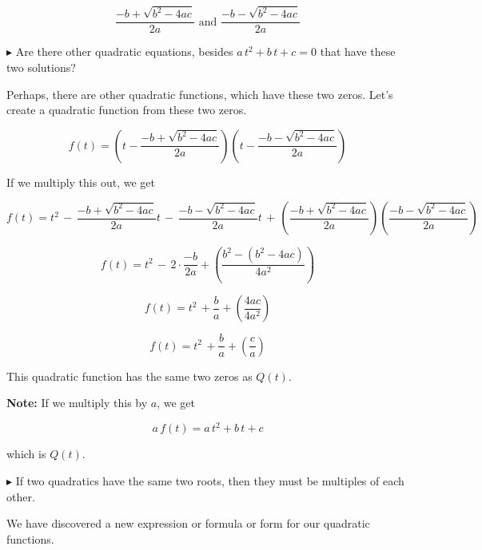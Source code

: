 \documentclass{ximera}
\begin{document}
\[   \frac{-b + \sqrt{b^2 - 4 a c}}{2a}     \text{ and }    \frac{-b - \sqrt{b^2 - 4 a c}}{2a}   \]





$\blacktriangleright$  Are there other quadratic equations, besides $a \, t^2 + b \, t + c = 0$ that have these two solutions?















Perhaps, there are other quadratic functions, which have these two zeros. Let's create a quadratic function from these two zeros.



\[ f(t) =  \left(t - \frac{-b + \sqrt{b^2 - 4 a c}}{2a}\right)   \left(t -  \frac{-b - \sqrt{b^2 - 4 a c}}{2a}\right)   \]


If we multiply this out, we get



\[ f(t) =   t^2 \, - \, \frac{-b + \sqrt{b^2 - 4 a c}}{2a} t \, - \, \frac{-b - \sqrt{b^2 - 4 a c}}{2a}  t \, + \, \left(\frac{-b + \sqrt{b^2 - 4 a c}}{2a}\right) \left(\frac{-b - \sqrt{b^2 - 4 a c}}{2a}\right) \]


\[ f(t) = t^2  \, - \, 2 \cdot \frac{-b}{2a} + \left(    \frac{b^2 - (b^2 - 4 a c)}{4 a^2}     \right)        \]


\[ f(t) = t^2  \, + \frac{b}{a} + \left(    \frac{4 a c}{4 a^2}     \right)        \]

\[ f(t) = t^2  \, +  \frac{b}{a} + \left(    \frac{c}{a}     \right)        \]


This quadratic function has the same two zeros as $Q(t)$.  


\textbf{Note:} If we multiply this by $a$, we get 


\[ a \, f(t) = a \, t^2 + b \, t + c \]

which is $Q(t)$.


$\blacktriangleright$ If two quadratics have the same two roots, then they must be multiples of each other.






We have discovered a new expression or formula or form for our quadratic functions.
\end{document}
